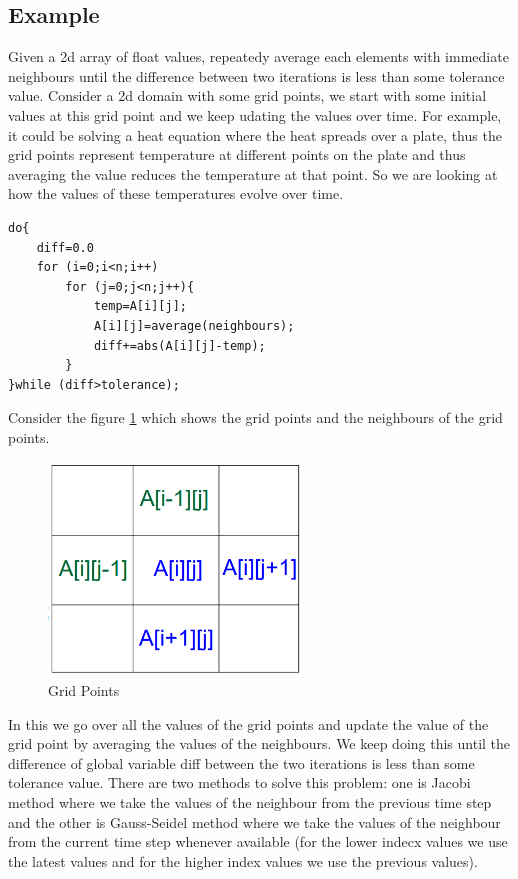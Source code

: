\documentclass[12pt]{article}
\begin{document}
\subsection{Example}
Given a 2d array of float values, repeatedy average each elements with immediate neighbours until the difference between two
iterations is less than some tolerance value. Consider a 2d domain with some grid points, we start with some initial values at this grid point and we keep udating the values over time.
For example, it could be solving a heat equation where the heat spreads over a plate, thus the grid points represent temperature at different points on the plate and thus averaging the value reduces the temperature at that point.
So we are looking at how the values of these temperatures evolve over time.

\begin{lstlisting}[caption={Parallel Program for Averaging},captionpos=b]
do{
    diff=0.0
    for (i=0;i<n;i++)
        for (j=0;j<n;j++){
            temp=A[i][j];
            A[i][j]=average(neighbours);
            diff+=abs(A[i][j]-temp);
        }
}while (diff>tolerance);    
\end{lstlisting}
Consider the figure \ref{fig:grid} which shows the grid points and the neighbours of the grid points.
\begin{figure}[H]
    \centering
    \includegraphics[width=0.6\textwidth]{images/grid.png}
    \caption{Grid Points}
    \label{fig:grid}
\end{figure}
In this we go over all the values of the grid points and update the value of the grid point by averaging the values of the neighbours. We keep doing this until the difference of global variable diff between the two iterations is less than some tolerance value.
There are two methods to solve this problem: one is Jacobi method where we take the values of the neighbour from the previous time step and the other is Gauss-Seidel method where we take the values of the neighbour from the current time step whenever available (for the lower indecx values we use the latest values and for the higher index values we use the previous values).
\end{document}
